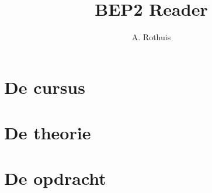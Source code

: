 \documentclass[dutch,a4paper,12pt,doubleside]{book}
\title{BEP2 Reader}
\author{A. Rothuis}
\begin{document}
\maketitle

{\hypersetup{linkcolor=black}
\tableofcontents
}


\part{De cursus}


\part{De theorie}







\part{De opdracht}










\end{document}

